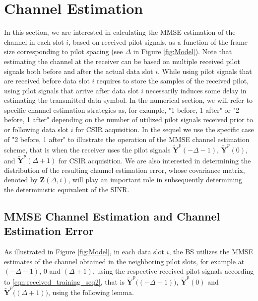 \documentclass[conference, a4paper, 10pt]{IEEEtran}
\newcommand{\mx}[1]{\mathbf{#1}}
\begin{document}
\section{Channel Estimation}
\label{Sec:ChannelE}
In this section, we are interested in calculating the \ac{MMSE} estimation of the
channel in each slot $i$, based on received pilot signals, as a function of the frame
size corresponding to pilot spacing (see $\Delta$ in Figure \ref{fig:Model}).
Note that estimating the channel at the receiver can be based on
multiple received pilot signals both before and after the actual data slot $i$.
While using pilot signals that are received before data slot $i$ requires to
store the samples of the received pilot, using pilot signals that arrive after
data slot $i$ necessarily induces some delay in estimating the transmitted data symbol.
In the numerical section, we will refer to specific channel estimation strategies
as, for example, "1 before, 1 after" or "2 before, 1 after" depending on the number
of utilized pilot signals received prior to or following data slot $i$
for \ac{CSIR} acquisition.
In the sequel we use the specific case of "2 before, 1 after" to illustrate the
operation of the \ac{MMSE} channel estimation scheme,
that is when the receiver uses the pilot signals
$\mathbf{\tilde Y}^p(-\Delta-1)$, $\mathbf{\tilde Y}^p(0)$, and $\mathbf{\tilde Y}^p(\Delta+1)$
for \ac{CSIR} acquisition.
We are also interested in determining the distribution of the
resulting channel estimation error, whose covariance matrix, denoted by
$\mx{Z}(\Delta,i)$, will play an important role in subsequently determining
the deterministic equivalent of the \ac{SINR}.
\vspace{-2mm}
\subsection{\ac{MMSE} Channel Estimation and Channel Estimation Error}
As illustrated in Figure \ref{fig:Model},
in each data slot $i$, the \ac{BS} utilizes the \ac{MMSE} estimates of the channel
obtained in the neighboring pilot slots, for example at $(-\Delta-1)$, $0$ and $(\Delta+1)$, %
using the respective received pilot signals according to \eqref{eqn:received_training_seq2}, that is
$\mathbf{\tilde Y}^p\big((-\Delta-1)\big)$, $\mathbf{\tilde Y}^p(0)$ and $\mathbf{\tilde Y}^p\big((\Delta+1)\big)$, using the following lemma.
\end{document}
